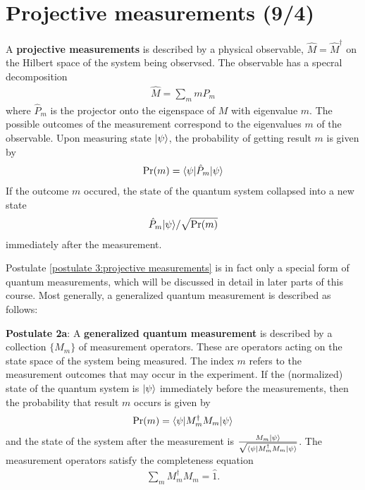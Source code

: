 \section{Projective measurements (9/4)}


\begin{pos}\label{postulate 3:projective measurements}
    A \textbf{projective measurements} is described by a physical observable, $\hat M=\hat M^\dagger$ on the Hilbert space of the system being observsed. The observable has a specral decomposition
    \begin{align}
\hat M=\sum_m m\hat P_m
    \end{align}
    where $\hat P_m$ is the projector onto the eigenspace of $M$ with eigenvalue $m$. The possible outcomes of the measurement correspond to the eigenvalues $m$ of the observable. Upon measuring state $|{\psi}\rangle$, the probability of getting result $m$ is given by
    \begin{align}
\text{Pr}(m)=\langle{\psi|\hat P_m|\psi}\rangle
    \end{align}
    If the outcome $m$ occured, the state of the quantum system collapsed into a new state
    \begin{align}
    \hat P_m|{\psi}\rangle/\sqrt{\text{Pr}(m)}
    \end{align}
    immediately after the measurement.
\end{pos}

Postulate \ref{postulate 3:projective measurements} is in fact only a special form of quantum measurements, which will be discussed in detail in later parts of this course. Most generally, a generalized quantum measurement is described as follows:

\textbf{Postulate 2a}: A \textbf{generalized quantum measurement} is described by a collection $\{M_m\}$ of measurement operators. These are operators acting on the state space of the system being measured. The index $m$ refers to the measurement outcomes that may occur in the experiment. If the (normalized) state of the quantum system is $|{\psi}\rangle$ immediately before the measurements, then the probability that result $m$ occurs is given by
    \begin{align}
    \text{Pr}(m)=\langle{\psi|M_m^\dagger M_m|\psi}\rangle
    \end{align}
    and the state of the system after the measurement is $\frac{M_m|{\psi}\rangle}{\sqrt{\langle{\psi|M_m^\dagger M_m|\psi}\rangle}}$. The measurement operators satisfy the completeness equation
    \begin{align}\label{completeness equation}
    \sum_mM_m^\dagger M_m=\hat 1.
    \end{align}


